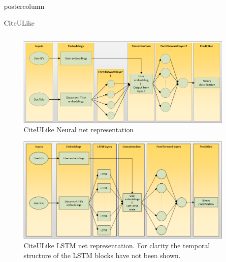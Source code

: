 \documentclass[final,hyperref={pdfpagelabels=false}]{beamer}
\begin{document}
\begin{frame}
\begin{columns}
\begin{column}{.49\paperwidth}
\begin{beamercolorbox}[center,wd=\textwidth]{postercolumn}
\begin{minipage}[T]{.99\textwidth}
{\begin{block}{CiteULike}
\begin{columns}
\begin{column}{1\textwidth}
\begin{minipage}[t]{0.96\textwidth}
 \begin{figure}

\includegraphics[width=0.95\textwidth]{CiteuLikeNet.png}
 \caption{CiteULike Neural net representation} \label{fig:CuL_net}
\end{figure}  

\begin{figure}

\includegraphics[width=0.95\textwidth]{CiteuLikeLSTM.png}
 \caption{CiteULike LSTM net representation. For clarity the temporal structure of the LSTM blocks have not been shown.} \label{fig:CuL_lstm_net}
\end{figure}


\begin{columns}
 \begin{column}{0.33\textwidth}
 

	\begin{figure}


\end{figure}
\end{column}
\end{columns}
\end{minipage}
\end{column}
\end{columns}
\end{block}}
\end{minipage}
\end{beamercolorbox}
\end{column}
\end{columns}
\end{frame}
\end{document}
